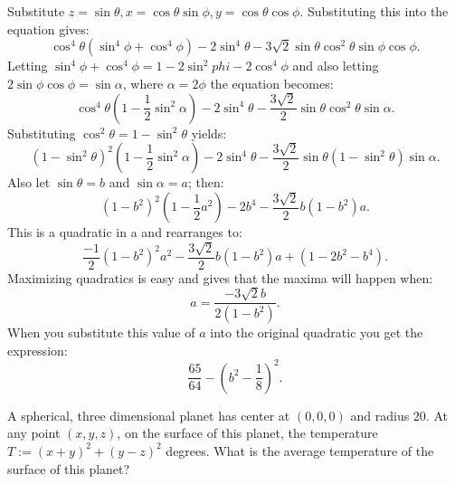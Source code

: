 \documentclass[12pt,a4paper]{memoir}
\theoremstyle{definition}
\begin{document}
\begin{solution}[name={Solution by WeakMathemetician}]
	Substitute $z=\sin\theta, x = \cos\theta \sin\phi, y = \cos\theta \cos\phi$. Substituting this into the equation gives:
	$$\cos^4 \theta(\sin^4\phi + \cos^4\phi) - 2\sin^4\theta - 3\sqrt{2} \sin\theta \cos^2 \theta \sin \phi \cos \phi.$$ Letting $\sin^4\phi + \cos^4\phi = 1-2\sin^2phi -2 \cos^4 \phi$ and also letting $2\sin \phi\cos \phi= \sin \alpha$, where $\alpha = 2\phi$ the equation becomes:
	$$\cos^4 \theta (1 - \frac{1}{2} \sin^2 \alpha) - 2\sin^4 \theta - \frac{3 \sqrt{2}}{2} \sin \theta \cos^2 \theta \sin \alpha.$$
	Substituting $\cos^2 \theta = 1- \sin^2 \theta$ yields:
	$$(1-\sin^2 \theta)^2(1- \frac{1}{2} \sin^2 \alpha) - 2 \sin^4 \theta - \frac{3 \sqrt{2}}{2} \sin \theta (1- \sin^2 \theta) \sin \alpha.$$
	Also let $\sin \theta = b$ and $ \sin \alpha = a$; then:
	$$(1-b^2)^2(1- \frac{1}{2}a^2) - 2b^4 - \frac{3 \sqrt{2}}{2} b(1-b^2)a.$$
	This is a quadratic in a and rearranges to:
	$$\frac{-1}{2}(1-b^2)^2a^2 -\frac{3 \sqrt{2}}{2} b(1-b^2)a + (1-2b^2-b^4).$$ Maximizing quadratics is easy and gives that the maxima will happen when:
	$$a = \frac{-3\sqrt{2}b}{2(1-b^2)}.$$ When you substitute this value of $a$ into the original quadratic you get the expression:
	$$\frac{65}{64} - (b^2- \frac{1}{8})^2.$$
\end{solution}



\begin{question} 
	A spherical, three dimensional planet has center at $(0,0,0)$ and radius $20$. At any point $(x,y,z)$, on the surface of this planet, the temperature $T:=(x+y)^2+(y-z)^2$ degrees. What is the average temperature of the surface of this planet?
\end{question}
\end{document}

